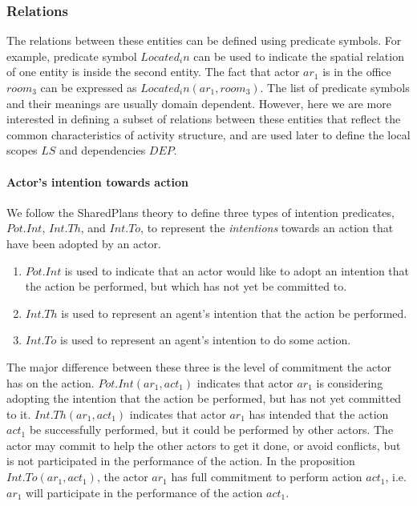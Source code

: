 \subsubsection{Relations} %
\label{ssub:relations}
The relations between these entities can be defined using predicate symbols. For example, predicate symbol $Located_in$ can be used to indicate the spatial relation of one entity is inside the second entity. The fact that actor $ar_1$ is in the office $room_3$ can be expressed as $Located_in(ar_1, room_3)$. The list of predicate symbols and their meanings are usually domain dependent. However, here we are more interested in defining a subset of relations between these entities that reflect the common characteristics of activity structure, and are used later to define the local scopes $LS$ and dependencies $DEP$.

\paragraph*{Actor's intention towards action} %
\label{par:relations_between_action_and_agent}
We follow the SharedPlans theory \cite{grosz1996collaborative} to define three types of intention predicates, $Pot.Int$, $Int.Th$, and $Int.To$, to represent the \emph{intentions} towards an action that have been adopted by an actor. 
\begin{enumerate}
	\item $Pot.Int$ is used to indicate that an actor would like to adopt an intention that the action be performed, but which has not yet be committed to.
	\item $Int.Th$ is used to represent an agent's intention that the action be performed.
	\item $Int.To$ is used to represent an agent's intention to do some action.
\end{enumerate}

 The major difference between these three is the level of commitment the actor has on the action. $Pot.Int(ar_1, act_1)$ indicates that actor $ar_1$ is considering adopting the intention that the action be performed, but has not yet committed to it. $Int.Th(ar_1, act_1)$ indicates that actor $ar_1$ has intended that the action $act_1$ be successfully performed, but it could be performed by other actors. The actor may commit to help the other actors to get it done, or avoid conflicts, but is not participated in the performance of the action. In the proposition $Int.To(ar_1, act_1)$, the actor $ar_1$ has full commitment to perform action $act_1$, i.e. $ar_1$ will participate in the performance of the action $act_1$.

